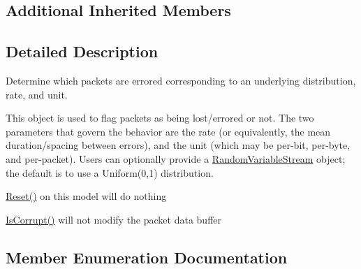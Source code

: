 \subsection*{Additional Inherited Members}


\subsection{Detailed Description}
Determine which packets are errored corresponding to an underlying distribution, rate, and unit. 

This object is used to flag packets as being lost/errored or not. The two parameters that govern the behavior are the rate (or equivalently, the mean duration/spacing between errors), and the unit (which may be per-\/bit, per-\/byte, and per-\/packet). Users can optionally provide a \hyperlink{classns3_1_1RandomVariableStream}{Random\+Variable\+Stream} object; the default is to use a Uniform(0,1) distribution.

\hyperlink{classns3_1_1ErrorModel_a6b7cbe56c27562e5ba6daf2f04bcd282}{Reset()} on this model will do nothing

\hyperlink{classns3_1_1ErrorModel_af75222d384e342b46d0aed09d5e3a3fd}{Is\+Corrupt()} will not modify the packet data buffer 

\subsection{Member Enumeration Documentation}
